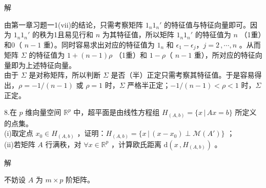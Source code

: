 \documentclass[12pt,hyperref,]{ctexart}
\begin{document}
解

\songti

由第一章习题一1(vii)的结论，只需考察矩阵 \(1_n1_n'\)
的特征值与特征向量即可。因为 \(1_n1_n'\) 的秩为1且易见行和 \(n\)
为其特征值，所以矩阵 \(1_n1_n'\) 的特征值为 \(n\) （1重）和0（ \(n-1\)
重）。同时容易求出对应的特征值为 \(1_n\) 和
\(\epsilon_1-\epsilon_j\text{，}j=2\, ,\cdots ,n\) 。从而矩阵 \(\Sigma\)
的特征值为 \(1+(n-1)\rho\) （1重）和 \(1-\rho\)（ \(n-1\)
重），所对应的特征向量即为上述特征向量。\\
由于 \(\Sigma\) 是对称矩阵，所以判断 \(\Sigma\)
是否（半）正定只需考察其特征值。于是容易得出，\(\rho=-1/(n-1)\) 或
\(\rho=1\) 时，\(\Sigma\) 严格半正定；\(-1/(n-1) < \rho <1\)
时，\(\Sigma\) 正定。

\vspace{3em}

\kaishu

8.在 \(p\) 维向量空间 \(\mathbb{R}^p\) 中，超平面是由线性方程组
\(H_{(A,b)}=\{x\, |\, Ax=b\}\) 所定义的点集。\\
(i)取定点 \(x_0\in H_{(A,b)}\)
，证明：\(H_{(A,b)}=\{x\, |\, (x-x_0) \perp \mathcal{M}(A')\}\) ；\\
(ii)若矩阵 \(A\) 行满秩，对 \(\forall x\in \mathbb{R}^p\) ，计算欧氏距离
\(\mathrm{d}(x\, ,H_{(A,b)})\) 。 \vspace{1em}

\heiti

解

\songti

不妨设 \(A\) 为 \(m\times p\) 阶矩阵。
\end{document}
